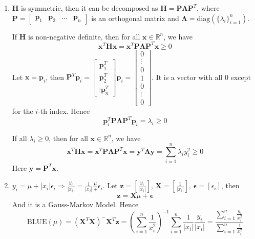 \documentclass{article}
\begin{document}
\begin{enumerate}[leftmargin = 0 em, label = \arabic*., font = \bfseries]
\begin{enumerate}
	      \end{enumerate}


	\item
	      $\bm H$ is symmetric, then it can be decomposed as $\bm H = \bm P \bm \Lambda \bm P^T$, where $\bm P = \begin{bmatrix}
			      \bm p_1 & \bm p_2 & \ldots & \bm p_n
		      \end{bmatrix}$ is an orthogonal matrix and $\bm \Lambda = \mathrm{diag}(\{\lambda_i\}_{i=1}^n)$.

	      If $\bm H$ is non-negative definite, then for all $\bm x \in \mathbb{R}^n$, we have
	      \[\bm x^T \bm H \bm x = \bm x^T \bm P \bm \Lambda \bm P^T \bm x \geq 0\]
	      Let $\bm x = \bm p_i$, then $\bm P^T \bm p_i = \begin{bmatrix}
			      \bm p_1^T \\
			      \bm p_2^T \\
			      \vdots
			      \bm p_n^T
		      \end{bmatrix} \bm p_i = \begin{bmatrix}
			      0      \\
			      \vdots \\
			      0      \\
			      1      \\
			      0      \\
			      \vdots \\
			      0
		      \end{bmatrix}$. It is a vector with all 0 except for the $i$-th index. Hence
	      \[\bm p_i^T \bm P \bm \Lambda \bm P^T \bm p_i = \lambda_i \geq 0\]

	      If all $\lambda_i \geq 0$, then for all $\bm x \in \mathbb{R}^n$, we have
	      \[\bm x^T \bm H \bm x = \bm x^T \bm P \bm \Lambda \bm P^T \bm x = \bm y^T \bm \Lambda \bm y = \sum_{i=1}^n \lambda_i y_i^2 \geq 0\]
	      Here $\bm y = \bm P^T \bm x$.


	\item
	      $y_i = \mu + |x_i| \epsilon_i \Rightarrow \frac{y_i}{|x_i|} = \frac{1}{|x_i|}\frac{\mu} + \epsilon_i$. Let $\bm z = \left[\frac{y_i}{|x_i|}\right],\, \bm X = \left[\frac{1}{|x_i|}\right] ,\, \bm \epsilon = \left[\epsilon_i\right]$, then
	      \[\bm z = \bm X \mu + \bm \epsilon\]
	      And it is a Gauss-Markov Model. Hence
	      \[\mathrm{BLUE}(\mu) = (\bm X^T \bm X)^- \bm X^T \bm z = \left(\sum_{i=1}^n \frac{1}{x_i^2}\right)^{-1} \sum_{i=1}^n \frac{1}{|x_i|} \frac{y_i}{|x_i|} = \frac{\sum_{i=1}^n \frac{y_i}{x_i^2}}{\sum_{i=1}^n{\frac{1}{x_i^2}}}\]


\end{enumerate}
\end{document}
